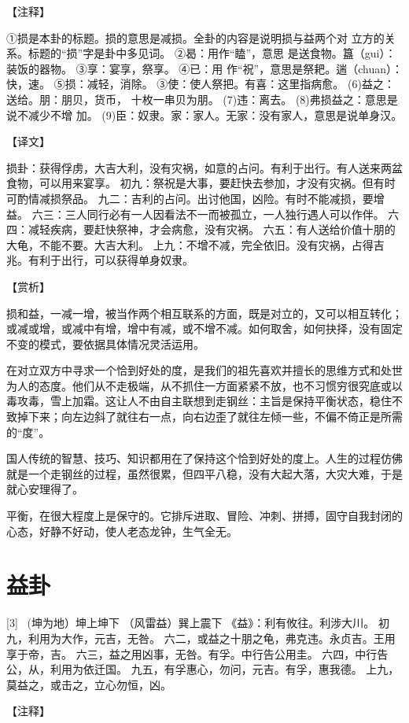 \documentclass[12pt,UTF8]{ctexbook}
\begin{document}
【注释】

①损是本卦的标题。损的意思是减损。全卦的内容是说明损与益两个对 立方的关系。标题的“损”字是卦中多见词。
②曷：用作“瞌”，意思 是送食物。簋（gui）：装饭的器物。
③享：宴享，祭享。
④已：用 作“祝”，意思是祭耙。遄（chuan）：快，速。
⑤损：减轻，消除。
③使：使人祭把。有喜：这里指病愈。
(6)益之：送给。朋：朋贝，货币， 十枚一串贝为朋。
(7)违：离去。
(8)弗损益之：意思是说不减少不增 加。
(9)臣：奴隶。家：家人。无家：没有家人，意思是说单身汉。

【译文】

损卦：获得俘虏，大吉大利，没有灾祸，如意的占问。有利于出行。有人送来两盆食物，可以用来宴享。
初九：祭祝是大事，要赶快去参加，才没有灾祸。但有时可酌情减损祭品。
九二：吉利的占问。出讨他国，凶险。有时不能减损，要增益。
六三：三人同行必有一人因看法不一而被孤立，一人独行遇人可以作伴。
六四：减轻疾病，要赶快祭神，才会病愈，没有灾祸。
六五：有人送给价值十朋的大龟，不能不要。大吉大利。
上九：不增不减，完全依旧。没有灾祸，占得吉兆。有利于出行，可以获得单身奴隶。

【赏析】

损和益，一减一增，被当作两个相互联系的方面，既是对立的，又可以相互转化；或减或增，或减中有增，增中有减，或不增不减。如何取舍，如何抉择，没有固定不变的模式，要依据具体情况灵活运用。

在对立双方中寻求一个恰到好处的度，是我们的祖先喜欢并擅长的思维方式和处世为人的态度。他们从不走极端，从不抓住一方面紧紧不放，也不习惯穷很究底或以毒攻毒，雪上加霜。这让人不由自主联想到走钢丝：主旨是保持平衡状态，稳住不致掉下来；向左边斜了就往右一点，向右边歪了就往左倾一些，不偏不倚正是所需的“度”。

国人传统的智慧、技巧、知识都用在了保持这个恰到好处的度上。人生的过程仿佛就是一个走钢丝的过程，虽然很累，但四平八稳，没有大起大落，大灾大难，于是就心安理得了。

平衡，在很大程度上是保守的。它排斥进取、冒险、冲刺、拼搏，固守自我封闭的心态，好静不好动，使人老态龙钟，生气全无。

\chapter{益卦}
[3] \ (坤为地）坤上坤下
（风雷益）巽上震下
《益》：利有攸往。利涉大川。
初九，利用为大作，元吉，无咎。
六二，或益之十朋之龟，弗克违。永贞吉。王用享于帝，吉。
六三，益之用凶事，无咎。有孚。中行告公用圭。
六四，中行告公，从，利用为依迁国。
九五，有孚惠心，勿问，元吉。有孚，惠我德。
上九，莫益之，或击之，立心勿恒，凶。

【注释】
\end{document}
